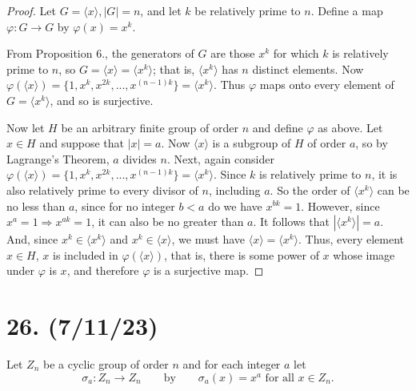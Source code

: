 \documentclass{article}
\begin{document}
\begin{proof}
    Let $G = \langle x \rangle, |G| = n$, and let $k$ be relatively prime to $n$. Define a map $\varphi: G \rightarrow G$ by $\varphi(x) = x^k$.

    From Proposition 6., the generators of $G$ are those $x^k$ for which $k$ is relatively prime to $n$, so $G = \langle x \rangle = \langle x^k \rangle$; that is, $\langle x^k \rangle$ has $n$ distinct elements. Now $\varphi(\langle x \rangle) = \{ 1, x^k, x^{2k}, ..., x^{(n - 1)k} \} = \langle x^k \rangle$. Thus $\varphi$ maps onto every element of $G = \langle x^k \rangle$, and so is surjective.

    Now let $H$ be an arbitrary finite group of order $n$ and define $\varphi$ as above. Let $x \in H$ and suppose that $|x| = a$. Now $\langle x \rangle$ is a subgroup of $H$ of order $a$, so by Lagrange's Theorem, $a$ divides $n$. Next, again consider $\varphi(\langle x \rangle) = \{ 1, x^k, x^{2k}, ..., x^{(n - 1)k} \} = \langle x^k \rangle$. Since $k$ is relatively prime to $n$, it is also relatively prime to every divisor of $n$, including $a$. So the order of $\langle x^k \rangle$ can be no less than $a$, since for no integer $b < a$ do we have $x^{bk} = 1$. However, since $x^a = 1 \Rightarrow x^{ak} = 1$, it can also be no greater than $a$. It follows that $|\langle x^k \rangle| = a$. And, since $x^k \in \langle x^k \rangle$ and $x^k \in \langle x \rangle$, we must have $\langle x \rangle = \langle x^k \rangle$. Thus, every element $x \in H$, $x$ is included in $\varphi(\langle x \rangle)$, that is, there is some power of $x$ whose image under $\varphi$ is $x$, and therefore $\varphi$ is a surjective map.
\end{proof}

\section*{26. (7/11/23)}

Let $Z_n$ be a cyclic group of order $n$ and for each integer $a$ let
\begin{equation*}
    \sigma_a: Z_n \rightarrow Z_n \qquad \text{by} \qquad \sigma_a(x) = x^a \text{ for all } x \in Z_n.
\end{equation*}
\end{document}
